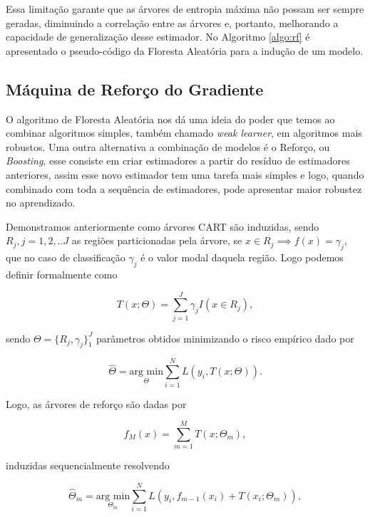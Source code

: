 Essa limitação garante que as árvores de entropia máxima não possam ser sempre
geradas, diminuindo a correlação entre as árvores e, portanto, melhorando a
capacidade de generalização desse estimador. No Algoritmo \ref{algo:rf} é
apresentado o pseudo-código da Floresta Aleatória para a indução de um modelo.

\subsection{Máquina de Reforço do Gradiente}

O algoritmo de Floresta Aleatória nos dá uma ideia do poder que temos ao
combinar algoritmos simples, também chamado \textit{weak learner}, em
algoritmos mais robustos. Uma outra alternativa a combinação de modelos é o
Reforço, ou \textit{Boosting}, esse consiste em criar estimadores a partir do
resíduo de estimadores anteriores, assim esse novo estimador tem uma tarefa
mais simples e logo, quando combinado com toda a sequência de estimadores, pode
apresentar maior robustez no aprendizado.

Demonstramos anteriormente como árvores CART são induzidas, sendo $R_j,j=1,2,..J$ as regiões particionadas pela árvore, se $x \in R_j \implies f(x) = \gamma_j$, que no caso de classificação $\gamma_j$ é o valor modal daquela região. Logo podemos definir formalmente como

\begin{equation}
    T(x;\Theta) = \sum_{j=1}^J \gamma_j I(x \in R_j),
\end{equation}

sendo $\Theta = \{R_j,\gamma_j\}_1^J$ parâmetros obtidos minimizando o risco empírico dado por

\begin{equation}
    \hat{\Theta} = \underset{\Theta}{\text{arg min}}
    \sum_{i=1}^N L(y_i,T(x;\Theta)).
\end{equation}

Logo, as árvores de reforço são dadas por

\begin{equation}
\label{eq:tree_boost}
    f_M(x) = \sum_{m=1}^M T(x;\Theta_m),
\end{equation}

induzidas sequencialmente resolvendo

\begin{equation}
    \hat{\Theta}_m = \underset{\Theta_m}{\text{arg min}}
    \sum_{i=1}^N L(y_i,f_{m-1}(x_i)+T(x_i;\Theta_m)),
\end{equation}

